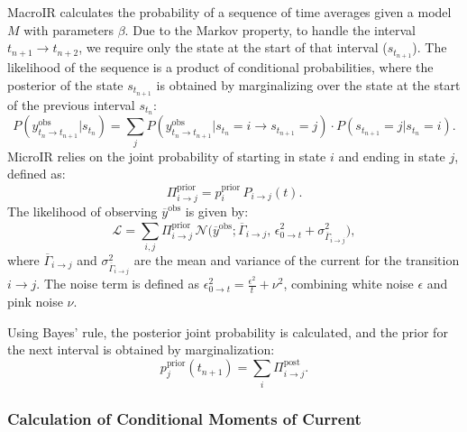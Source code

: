\documentclass[9pt]{elife}
\begin{document}
MacroIR calculates the probability of a sequence of time averages given a model $M$ with parameters $\beta$. Due to the Markov property, to handle the interval $t_{n+1} \rightarrow t_{n+2}$, we require only the state at the start of that interval ($s_{t_{n+1}}$). The likelihood of the sequence is a product of conditional probabilities, where the posterior of the state $s_{t_{n+1}}$ is obtained by marginalizing over the state at the start of the previous interval $s_{t_n}$:
\begin{equation}
	P(y^{\text{obs}}_{t_{n}\rightarrow t_{n+1}} | s_{t_n}) = \sum_{j} P(y^{\text{obs}}_{t_{n}\rightarrow t_{n+1}} | s_{t_n}=i \rightarrow s_{t_{n+1}}=j) \cdot P(s_{t_{n+1}}=j | s_{t_n}=i).
\end{equation}
MicroIR relies on the joint probability of starting in state \(i\) and ending in state \(j\), defined as:
\begin{equation}
	\Pi_{i\rightarrow j}^{\text{prior}} = p_i^{\text{prior}}\,P_{i\rightarrow j}(t).
	\label{eq:joint_state_prob}
\end{equation}
The likelihood of observing $\overline{y}^{\text{obs}}$ is given by:
\begin{equation}
	\mathcal{L} = \sum_{i,j} \Pi_{i\rightarrow j}^{\text{prior}}\,\mathcal{N}\!\Biggl(
	\overline{y}^{\text{obs}}; \overline{\Gamma}_{i\rightarrow j}, \,
	\epsilon ^2_{0 \rightarrow t}  + \sigma^2_{\overline{\Gamma}_{i\rightarrow j}}
	\Biggr),
	\label{eq:integrated_likelihood}
\end{equation}
where $\overline{\Gamma}_{i\rightarrow j}$ and $\sigma^2_{\overline{\Gamma}_{i\rightarrow j}}$ are the mean and variance of the current for the transition $i \rightarrow j$. The noise term is defined as $\epsilon ^2_{0 \rightarrow t} = \frac{\epsilon^2}{t} + \nu ^2$, combining white noise $\epsilon$ and pink noise $\nu$.

Using Bayes' rule, the posterior joint probability is calculated, and the prior for the next interval is obtained by marginalization:
\begin{equation}
	p_j^{\text{prior}}(t_{n+1}) = \sum_i \Pi_{i\rightarrow j}^{\text{post}}.
	\label{eq:next_prior_microIR}
\end{equation}

\subsubsection{Calculation of Conditional Moments of Current}
\label{sec:moments}
\end{document}
